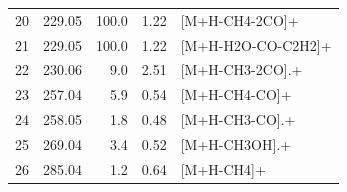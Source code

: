 \documentclass[]{article}
\begin{document}
\begin{table}[ht]
\begin{tabular}{rrrrl}
  20 & 229.05 & 100.0 & 1.22 & [M+H-CH4-2CO]+ \\ 
  21 & 229.05 & 100.0 & 1.22 & [M+H-H2O-CO-C2H2]+ \\ 
  22 & 230.06 & 9.0 & 2.51 & [M+H-CH3-2CO].+ \\ 
  23 & 257.04 & 5.9 & 0.54 & [M+H-CH4-CO]+ \\ 
  24 & 258.05 & 1.8 & 0.48 & [M+H-CH3-CO].+ \\ 
  25 & 269.04 & 3.4 & 0.52 & [M+H-CH3OH].+ \\ 
  26 & 285.04 & 1.2 & 0.64 & [M+H-CH4]+ \\ 
   \bottomrule
\end{tabular}
\end{table}

\clearpage

\setlength\tabcolsep{1.5pt}
\end{document}
